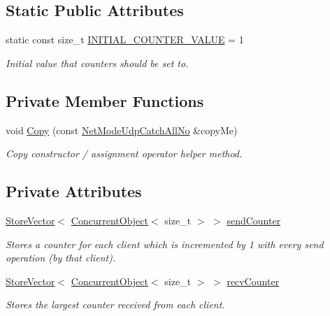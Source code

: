 \subsection*{Static Public Attributes}
\begin{DoxyCompactItemize}
\item 
static const size\_\-t \hyperlink{class_net_mode_udp_catch_all_no_a619f25540ba35059da5ee9c4ff607b67}{INITIAL\_\-COUNTER\_\-VALUE} = 1
\begin{DoxyCompactList}\small\item\em Initial value that counters should be set to. \item\end{DoxyCompactList}\end{DoxyCompactItemize}
\subsection*{Private Member Functions}
\begin{DoxyCompactItemize}
\item 
void \hyperlink{class_net_mode_udp_catch_all_no_aff06d1f5186a2d91e059e70c9c4ec273}{Copy} (const \hyperlink{class_net_mode_udp_catch_all_no}{NetModeUdpCatchAllNo} \&copyMe)
\begin{DoxyCompactList}\small\item\em Copy constructor / assignment operator helper method. \item\end{DoxyCompactList}\end{DoxyCompactItemize}
\subsection*{Private Attributes}
\begin{DoxyCompactItemize}
\item 
\hyperlink{class_store_vector}{StoreVector}$<$ \hyperlink{class_concurrent_object}{ConcurrentObject}$<$ size\_\-t $>$ $>$ \hyperlink{class_net_mode_udp_catch_all_no_a69712e7ab73688db35d386613174e325}{sendCounter}
\begin{DoxyCompactList}\small\item\em Stores a counter for each client which is incremented by 1 with every send operation (by that client). \item\end{DoxyCompactList}\item 
\hyperlink{class_store_vector}{StoreVector}$<$ \hyperlink{class_concurrent_object}{ConcurrentObject}$<$ size\_\-t $>$ $>$ \hyperlink{class_net_mode_udp_catch_all_no_a09585b76e3e50cebc9ad0fa795810228}{recvCounter}
\begin{DoxyCompactList}\small\item\em Stores the largest counter received from each client. \item\end{DoxyCompactList}\end{DoxyCompactItemize}


